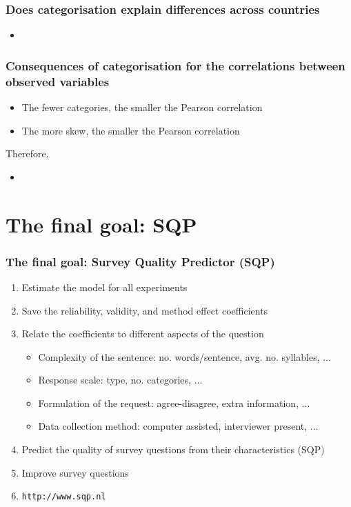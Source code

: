 \documentclass{beamer}
\begin{document}
\begin{frame}
\frametitle{Does categorisation explain differences across countries}

	\begin{itemize}
		\item 
	\end{itemize}
 
\end{frame}


\begin{frame}
\frametitle{Consequences of categorisation for the correlations between observed variables}

	\begin{itemize}[<alert@+>]
		\item The fewer categories, the smaller the Pearson correlation
		\item The more skew, the smaller the Pearson correlation
	\end{itemize}
 
	Therefore,
	\begin{itemize}[<alert@+>]
		\item 
	\end{itemize}

\end{frame}


\section{The final goal: SQP}

\begin{frame}
 \frametitle{The final goal: Survey Quality Predictor (SQP)}

	\begin{enumerate}[<alert@+>]
		\item Estimate the model for all experiments
		\item Save the reliability, validity, and method effect coefficients
		\item Relate the coefficients to different aspects of the question
			\begin{itemize}[<4-|alert@+>]
				\item Complexity of the sentence: no. words/sentence, avg. no. syllables, ...
				\item Response scale: type, no. categories, ...
				\item Formulation of the request: agree-disagree, extra information, ...
				\item Data collection method: computer assisted, interviewer present, ...
			\end{itemize}
		\item Predict the quality of survey questions from their characteristics (SQP)
		\item Improve survey questions
		\item \texttt{http://www.sqp.nl} 
	\end{enumerate}
\end{frame}
\end{document}
